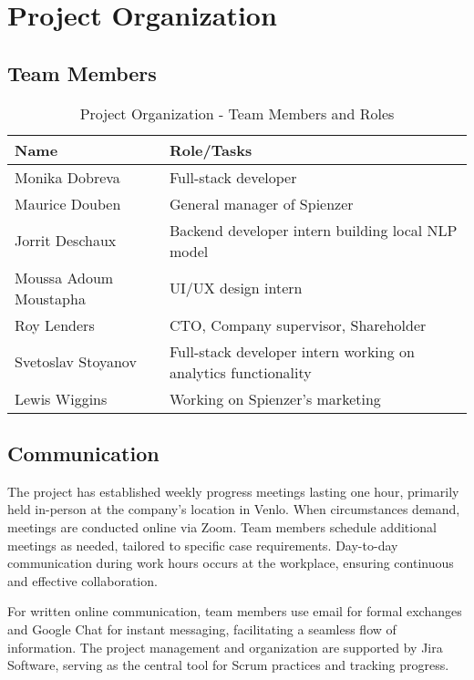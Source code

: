 \documentclass[12pt,a4paper]{article}
\begin{document}
\section{Project Organization}
\subsection{Team Members}


\begin{table}[h!]
\centering
\begin{tabular}{|l|l|}
\hline
\textbf{Name} & \textbf{Role/Tasks} \\
\hline
Monika Dobreva & Full-stack developer \\
\hline
Maurice Douben & General manager of Spienzer \\
\hline
Jorrit Deschaux & Backend developer intern building local NLP model \\
\hline
Moussa Adoum Moustapha & UI/UX design intern \\
\hline
Roy Lenders & CTO, Company supervisor, Shareholder \\
\hline
Svetoslav Stoyanov & Full-stack developer intern working on analytics functionality \\
\hline
Lewis Wiggins & Working on Spienzer’s marketing \\
\hline
\end{tabular}
\caption{Project Organization - Team Members and Roles}
\end{table}

\subsection{Communication}
The project has established weekly progress meetings lasting one hour, primarily held in-person at the company's location in Venlo. When circumstances demand, meetings are conducted online via Zoom. Team members schedule additional meetings as needed, tailored to specific case requirements. Day-to-day communication during work hours occurs at the workplace, ensuring continuous and effective collaboration. \vspace{1em} %

For written online communication, team members use email for formal exchanges and Google Chat for instant messaging, facilitating a seamless flow of information. The project management and organization are supported by Jira Software, serving as the central tool for Scrum practices and tracking progress.
\end{document}
